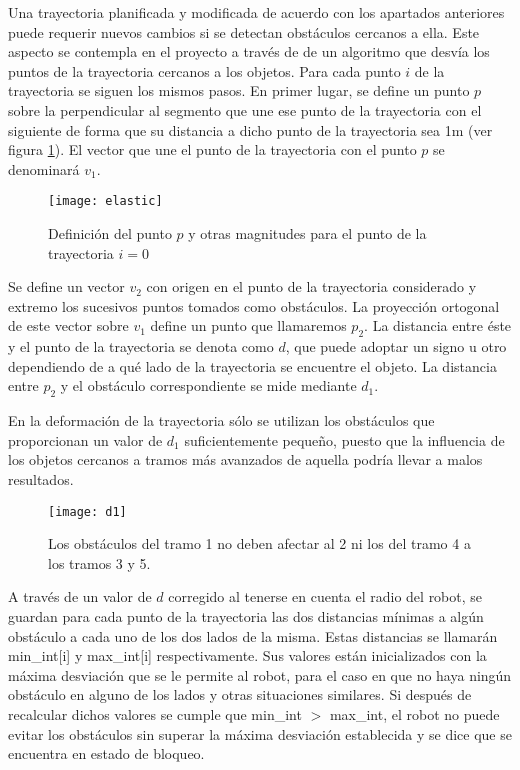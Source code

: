 Una trayectoria planificada y modificada de acuerdo con los apartados anteriores puede requerir nuevos cambios si se detectan obstáculos cercanos a ella. Este aspecto se contempla en el proyecto a través de de un algoritmo que desvía los puntos de la trayectoria cercanos a los objetos. Para cada punto $i$ de la trayectoria se siguen los mismos pasos. En primer lugar, se define un punto $p$ sobre la perpendicular al segmento que une ese punto de la trayectoria con el siguiente de forma que su distancia a dicho punto de la trayectoria sea 1m (ver figura \ref{fg:elastic}). El vector que une el punto de la trayectoria con el punto $p$ se denominará $v_{1}$.

\begin{figure}[h]
  \centering\texttt{[image: elastic]}\\
  \caption{Definición del punto $p$ y otras magnitudes para el punto de la trayectoria $i = 0$}\label{fg:elastic}
\end{figure}

Se define un vector $v_{2}$ con origen en el punto de la trayectoria considerado y extremo los sucesivos puntos tomados como obstáculos. La proyección ortogonal de este vector sobre $v_{1}$ define un punto que llamaremos $p_{2}$. La distancia entre éste y el punto de la trayectoria se denota como $d$, que puede adoptar un signo u otro dependiendo de a qué lado de la trayectoria se encuentre el objeto. La distancia entre $p_{2}$ y el obstáculo correspondiente se mide mediante $d_{1}$.

En la deformación de la trayectoria sólo se utilizan los obstáculos que proporcionan un valor de $d_{1}$ suficientemente pequeño, puesto que la influencia de los objetos cercanos a tramos más avanzados de aquella podría llevar a malos resultados.

\begin{figure}[h]
  \centering\texttt{[image: d1]}\\
  \caption{Los obstáculos del tramo 1 no deben afectar al 2 ni los del tramo 4 a los tramos 3 y 5.}\label{fg:d1}
\end{figure}

A través de un valor de $d$ corregido al tenerse en cuenta el radio del robot, se guardan para cada punto de la trayectoria las dos distancias mínimas a algún obstáculo a cada uno de los dos lados de la misma. Estas distancias se llamarán min\_int[i] y max\_int[i] respectivamente. Sus valores están inicializados con la máxima desviación que se le permite al robot, para el caso en que no haya ningún obstáculo en alguno de los lados y otras situaciones similares. Si después de recalcular dichos valores se cumple que min\_int $>$ max\_int, el robot no puede evitar los obstáculos sin superar la máxima desviación establecida y se dice que se encuentra en estado de bloqueo.


